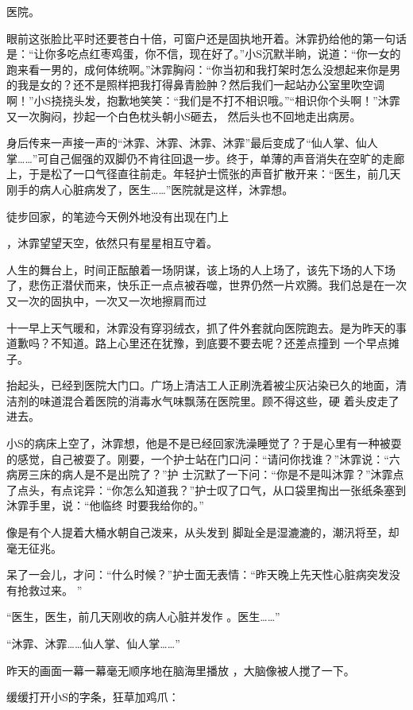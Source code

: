 \documentclass{article}
\begin{document}
医院。 

眼前这张脸比平时还要苍白十倍，可窗户还是固执地开着。沐霏扔给他的第一句话是：“让你多吃点红枣鸡蛋，你不信，现在好了。”小S沉默半晌，说道：“你一女的跑来看一男的，成何体统啊。”沐霏胸闷：“你当初和我打架时怎么没想起来你是男的我是女的？还不是照样把我打得鼻青脸肿？然后我们一起站办公室里吹空调啊！”小S挠挠头发，抱歉地笑笑：“我们是不打不相识哦。”“相识你个头啊！”沐霏又一次胸闷，抄起一个白色枕头朝小S砸去，
然后头也不回地走出病房。 

身后传来一声接一声的“沐霏、沐霏、沐霏、沐霏”最后变成了“仙人掌、仙人掌……”可自己倔强的双脚仍不肯往回退一步。终于，单薄的声音消失在空旷的走廊上，于是松了一口气径直往前走。年轻护士慌张的声音扩散开来：“医生，前几天刚手的病人心脏病发了，医生……”医院就是这样，沐霏想。

徒步回家，的笔迹今天例外地没有出现在门上
\newpage

，沐霏望望天空，依然只有星星相互守着。 

人生的舞台上，时间正酝酿着一场阴谋，该上场的人上场了，该先下场的人下场了，悲伤正潜伏而来，快乐正一点点被吞噬，世界仍然一片欢腾。我们总是在一次又一次的固执中，一次又一次地擦肩而过

十一早上天气暖和，沐霏没有穿羽绒衣，抓了件外套就向医院跑去。是为昨天的事道歉吗？不知道。路上心里还在犹豫，到底要不要去呢？还差点撞到
一个早点摊子。 

抬起头，已经到医院大门口。广场上清洁工人正刷洗着被尘灰沾染已久的地面，清洁剂的味道混合着医院的消毒水气味飘荡在医院里。顾不得这些，硬
着头皮走了进去。 

小S的病床上空了，沐霏想，他是不是已经回家洗澡睡觉了？于是心里有一种被耍的感觉，自己被耍了。刚要，一个护士站在门口问：“请问你找谁？”沐霏说：“六病房三床的病人是不是出院了？”护
\newpage
士沉默了一下问：“你是不是叫沐霏？”沐霏点了点头，有点诧异：“你怎么知道我？”护士叹了口气，从口袋里掏出一张纸条塞到沐霏手里，说：“他临终
时要我给你的。” 

像是有个人提着大桶水朝自己泼来，从头发到
脚趾全是湿漉漉的，潮汛将至，却毫无征兆。 

呆了一会儿，才问：“什么时候？”护士面无表情：“昨天晚上先天性心脏病突发没有抢救过来。
” 

“医生，医生，前几天刚收的病人心脏并发作
。医生……” 


“沐霏、沐霏……仙人掌、仙人掌……” 

昨天的画面一幕一幕毫无顺序地在脑海里播放
，大脑像被人搅了一下。 


\newpage

缓缓打开小S的字条，狂草加鸡爪： 
\end{document}

